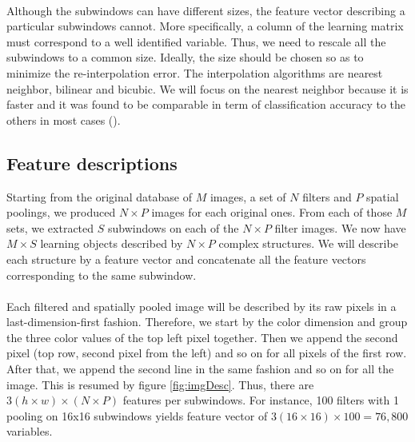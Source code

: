 \documentclass[a4paper]{report}
\begin{document}
		\paragraph{}
		Although the subwindows can have different sizes, the feature vector describing a particular subwindows cannot. More specifically, a column of the learning matrix must correspond to a well identified variable. Thus, we need to rescale all the subwindows to a common size. Ideally, the size should be chosen so as to minimize the re-interpolation error. The interpolation algorithms are nearest neighbor, bilinear and bicubic. We will focus on the nearest neighbor because it is faster and it was found to be comparable in term of classification accuracy to the others in most cases (\cite{base}).
		
		\subsection{Feature descriptions}		
		Starting from the original database of $M$ images, a set of $N$ filters and $P$ spatial poolings, we produced $N \times P$ images for each original ones. From each of those $M$ sets, we extracted $S$ subwindows on each of the $N \times P$ filter images. We now have $M \times S$ learning objects described by $N \times P$ complex structures. We will describe each structure by a feature vector and concatenate all the feature vectors corresponding to the same subwindow.
		\paragraph{}
		Each filtered and spatially pooled image will be described by its raw pixels in a last-dimension-first fashion. Therefore, we start by the color dimension and group the three color values of the top left pixel together. Then we append the second pixel (top row, second pixel from the left) and so on for all pixels of the first row. After that, we append the second line in the same fashion and so on for all the image. This is resumed by figure \ref{fig:imgDesc}.
		Thus, there are $3(h \times w) \times (N \times P)$ features per subwindows. For instance, 100 filters with 1 pooling on 16x16 subwindows yields feature vector of $3(16 \times 16) \times 100 = 76,800$ variables.
		
\end{document}
